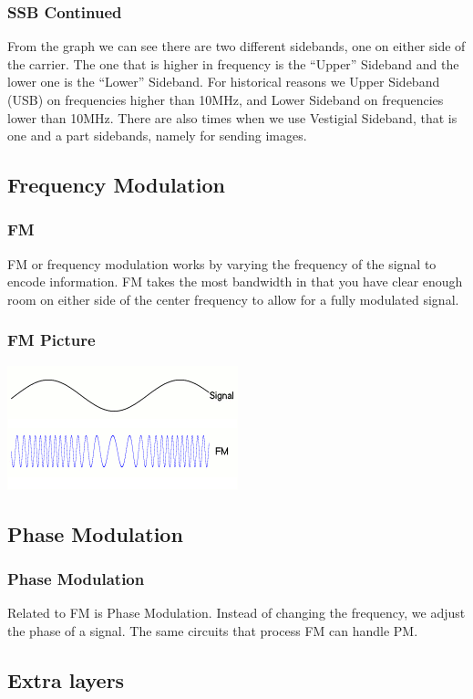 \documentclass[10pt, handout]{beamer}
\begin{document}
\begin{frame}
\frametitle{SSB Continued}
From the graph we can see there are two different sidebands, one on either side of the carrier. The one that is higher in frequency is the ``Upper'' Sideband and the lower one is the ``Lower'' Sideband. For historical reasons we Upper Sideband (USB) on frequencies higher than 10MHz, and Lower Sideband on frequencies lower than 10MHz. There are also times when we use Vestigial Sideband, that is one and a part sidebands, namely for sending images.
\end{frame}

\subsection{Frequency Modulation}

\begin{frame}
\frametitle{FM}
FM or frequency modulation works by varying the frequency of the signal to encode information. FM takes the most bandwidth in that you have clear enough room on either side of the center frequency to allow for a fully modulated signal.
\end{frame}

\begin{frame}
\frametitle{FM Picture}
\includegraphics[height=.5\textheight]{fm.png}
\end{frame}

\subsection{Phase Modulation}

\begin{frame}
\frametitle{Phase Modulation}
Related to FM is Phase Modulation. Instead of changing the frequency, we adjust the phase of a signal. The same circuits that process FM can handle PM.
\end{frame}

\subsection{Extra layers}
\end{document}
